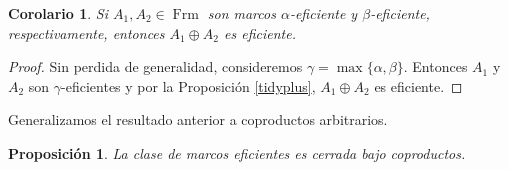 \documentclass[12pt]{article}
\newtheorem{cor}[thm]{Corolario}
\newtheorem{prop}[thm]{Proposición}
\DeclareMathOperator{\Frm}{Frm}
\begin{document}
\begin{cor}\label{Paso 3}
Si $A_1, A_2\in \Frm$ son marcos $\alpha$-eficiente y $\beta$-eficiente, respectivamente, entonces $A_1\oplus A_2$ es eficiente.
\end{cor}

\begin{proof}
Sin perdida de generalidad, consideremos $\gamma=\max\{\alpha, \beta\}$. Entonces $A_1$ y $A_2$ son $\gamma$-eficientes y por la Proposición \ref{tidyplus}, $A_1\oplus A_2$ es eficiente.
\end{proof}

Generalizamos el resultado anterior a coproductos arbitrarios.
\begin{prop}\label{coprodE}
La clase de marcos eficientes es cerrada bajo coproductos.
\end{prop}
\end{document}
